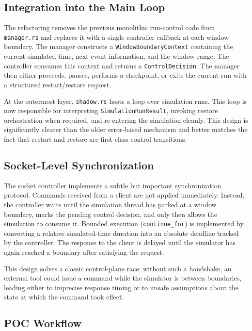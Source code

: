 \documentclass[11pt,a4paper]{article}
\begin{document}
\subsection{Integration into the Main Loop}

The refactoring removes the previous monolithic run-control code from
\texttt{manager.rs} and replaces it with a single controller callback at each
window boundary. The manager constructs a \texttt{WindowBoundaryContext}
containing the current simulated time, next-event information, and the window
range. The controller consumes this context and returns a
\texttt{ControlDecision}. The manager then either proceeds, pauses, performs a
checkpoint, or exits the current run with a structured restart/restore
request.

At the outermost layer, \texttt{shadow.rs} hosts a loop over simulation runs.
This loop is now responsible for interpreting \texttt{SimulationRunResult},
invoking restore orchestration when required, and re-entering the simulation
cleanly. This design is significantly clearer than the older error-based
mechanism and better matches the fact that restart and restore are
first-class control transitions.

\subsection{Socket-Level Synchronization}

The socket controller implements a subtle but important synchronization
protocol. Commands received from a client are not applied immediately. Instead,
the controller waits until the simulation thread has parked at a window
boundary, marks the pending control decision, and only then allows the
simulation to consume it. Bounded execution (\texttt{continue\_for}) is
implemented by converting a relative simulated-time duration into an absolute
deadline tracked by the controller. The response to the client is delayed until
the simulator has again reached a boundary after satisfying the request.

This design solves a classic control-plane race: without such a handshake, an
external tool could issue a command while the simulator is between boundaries,
leading either to imprecise response timing or to unsafe assumptions about the
state at which the command took effect.

\subsection{POC Workflow}
\end{document}
